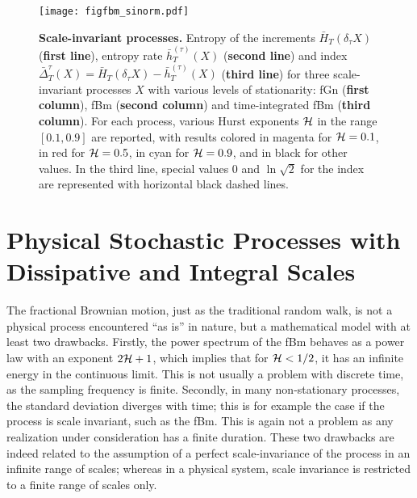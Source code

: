 \documentclass[aps,pra,groupedaddress,notitlepage]{revtex4-1}
\begin{document}
\begin{figure}[htb]
\texttt{[image: figfbm\_sinorm.pdf]}
\caption{{\bf Scale-invariant processes.} %
Entropy of the increments $\bar{H}_T(\delta_\tau X)$ (\textbf{first line}), entropy rate $\bar{h}^{(\tau)}_T(X)$ (\textbf{second line}) and index $\bar{\Delta}_T^{\tau}(X)=\bar{H}_T(\delta_\tau X)-\bar{h}^{(\tau)}_T(X)$ (\textbf{third line}) for three scale-invariant processes $X$ with various levels of stationarity: fGn (\textbf{first column}), fBm (\textbf{second column}) and time-integrated fBm (\textbf{third column}). For each process, various Hurst exponents ${\cal H}$ in the range $[0.1, 0.9]$ are reported, {with results colored in magenta for ${\cal H}=0.1$, in red for ${\cal H}=0.5$, in cyan for ${\cal H}=0.9$, and in black for other values.
In the third line, special values 0 and $\ln\sqrt{2}$ for the index are represented with horizontal black dashed lines.}
}
\label{fig:FBM}
\end{figure}



\section{Physical Stochastic Processes with Dissipative and Integral Scales}
\label{sec:physProc}

The fractional Brownian motion, just as the traditional random walk, is not a physical process encountered ``as is'' in nature, but a mathematical model with at least two drawbacks. Firstly, the power spectrum of the fBm behaves as a power law with an exponent $2{\cal H}+1$, which implies that for ${\cal H}<1/2$, it has an infinite energy in the continuous limit. This is not usually a problem with discrete time, as the sampling frequency is finite. Secondly, {in many non-stationary processes,} the standard deviation diverges with time; {this is for example the case if the process is scale invariant, such as the fBm}. This is again not a problem as any realization under consideration has a finite duration. These two drawbacks are indeed related to the assumption of a perfect scale-invariance of the process in an infinite range of scales; whereas in a physical system, scale invariance is restricted to a finite range of scales only.
\end{document}
